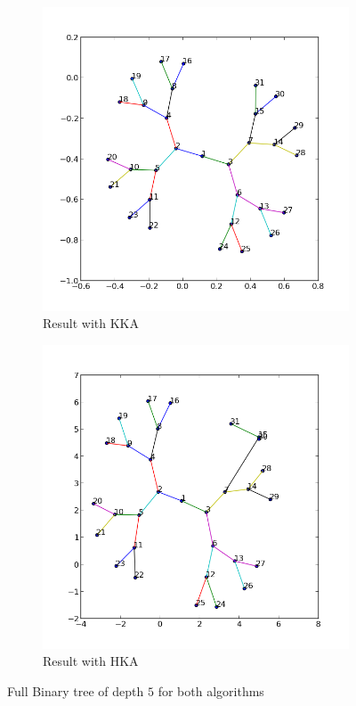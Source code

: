 \documentclass[12pt,a4paper]{article}
\begin{document}
\begin{figure}[htb]
	 \begin{subfigure}{0.5\textwidth}
		   \centering
           \includegraphics[scale=0.45]{results_Kawai/binary5kk}
           \caption{Result with KKA}
     \end{subfigure}
	 \begin{subfigure}{0.5\textwidth}
			\centering
           \includegraphics[scale=0.45]{results_Kawai/binary5hk}
            \caption{Result with HKA}
     \end{subfigure}
     \caption{Full Binary tree of depth $5$ for both algorithms }
     \label{fig: bincomp}
\end{figure}  
\end{document}
